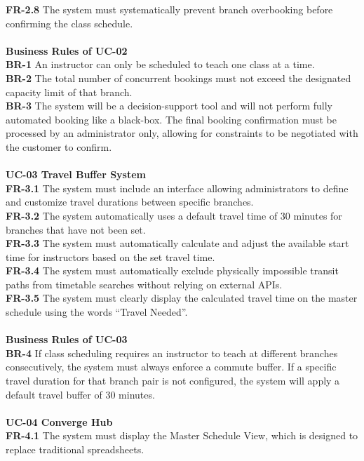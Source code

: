 \textbf{FR-2.8} The system must systematically prevent branch overbooking before confirming the class schedule. \\
\\
\textbf{Business Rules of UC-02} \\
\textbf{BR-1} An instructor can only be scheduled to teach one class at a time. \\
\textbf{BR-2} The total number of concurrent bookings must not exceed the designated capacity limit of that branch. \\
\textbf{BR-3} The system will be a decision-support tool and will not perform fully automated booking like a black-box. The final booking confirmation must be processed by an administrator only, allowing for constraints to be negotiated with the customer to confirm. \\
\\
\textbf{UC-03 Travel Buffer System} \\
\textbf{FR-3.1} The system must include an interface allowing administrators to define and customize travel durations between specific branches. \\
\textbf{FR-3.2} The system automatically uses a default travel time of 30 minutes for branches that have not been set. \\
\textbf{FR-3.3} The system must automatically calculate and adjust the available start time for instructors based on the set travel time. \\
\textbf{FR-3.4} The system must automatically exclude physically impossible transit paths from timetable searches without relying on external APIs. \\
\textbf{FR-3.5} The system must clearly display the calculated travel time on the master schedule using the words \enquote{Travel Needed}. \\
\\
\textbf{Business Rules of UC-03} \\
\textbf{BR-4} If class scheduling requires an instructor to teach at different branches consecutively, the system must always enforce a commute buffer. If a specific travel duration for that branch pair is not configured, the system will apply a default travel buffer of 30 minutes. \\
\\
\textbf{UC-04 Converge Hub} \\
\textbf{FR-4.1} The system must display the Master Schedule View, which is designed to replace traditional spreadsheets. \\
